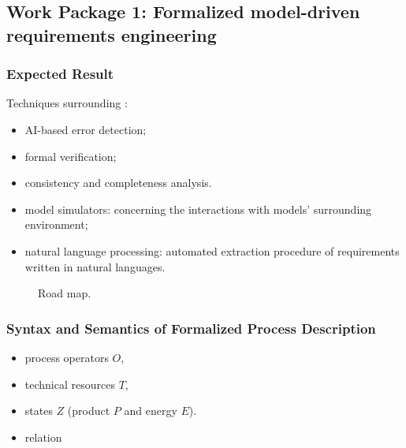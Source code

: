 \subsection{Work Package 1: Formalized model-driven requirements engineering}

\subsubsection{Expected Result}

Techniques surrounding :
\vspace{-.5cm}
\begin{itemize}
  \item AI-based error detection;
  \item formal verification;
  \item consistency and completeness analysis.
  \item model simulators: concerning the interactions with models' 
    surrounding environment;
  \item natural language processing: automated extraction procedure 
    of requirements written in natural languages.
\end{itemize}

\begin{figure}[H]
\centering  
{}
\caption{Road map.}
\end{figure}

\subsubsection{Syntax and Semantics of Formalized Process Description}

\begin{itemize}
  \item process operators $O$,
  \item technical resources $T$,
  \item states $Z$ (product $P$ and energy $E$).
  \item relation 
\end{itemize}

